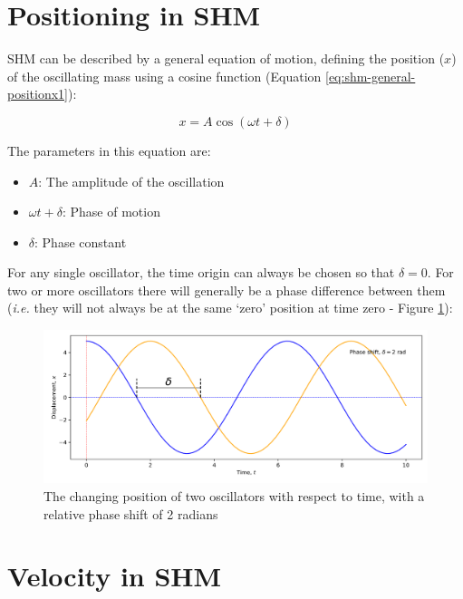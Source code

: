 \documentclass[
]{book}
\providecommand{\tightlist}{%
  \setlength{\itemsep}{0pt}\setlength{\parskip}{0pt}}
\begin{document}
\hypertarget{sec:shm-position}{%
\section{Positioning in SHM}\label{sec:shm-position}}

SHM can be described by a general equation of motion, defining the position (\(x\)) of the oscillating mass using a cosine function (Equation \eqref{eq:shm-general-positionx1}):

\begin{equation}
x = A \cos (\omega t + \delta)
\label{eq:shm-general-positionx1}
\end{equation}

The parameters in this equation are:

\begin{itemize}
\tightlist
\item
  \(A\): The amplitude of the oscillation
\item
  \(\omega t + \delta\): Phase of motion
\item
  \(\delta\): Phase constant
\end{itemize}

For any single oscillator, the time origin can always be chosen so that \(\delta = 0\). For two or more oscillators there will generally be a phase difference between them (\emph{i.e.} they will not always be at the same `zero' position at time zero - Figure \ref{fig:ch1-shmpos-1}):

\begin{figure}

{\centering \includegraphics[width=0.7\linewidth]{visualisations/ch1-shmpos} 

}

\caption{The changing position of two oscillators with respect to time, with a relative phase shift of 2 radians }\label{fig:ch1-shmpos-1}
\end{figure}

\hypertarget{sec:shm-velocity}{%
\section{Velocity in SHM}\label{sec:shm-velocity}}
\end{document}
